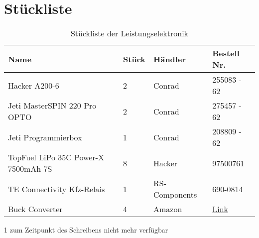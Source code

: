 \section{Stückliste}

\begin{table}[h]
    \begin{threeparttable}
    \centering
    \begin{tabular}{|l|l|l|l|}
        \hline
    Name                         & Stück & Händler & Bestell Nr. \\\hline
    Hacker A200-6                & 2      & Conrad  & 255083 - 62 \\
    Jeti MasterSPIN 220 Pro OPTO & 2      & Conrad  & 275457 - 62 \\
    Jeti Programmierbox          & 1      & Conrad  & 208809 - 62 \\
    TopFuel LiPo 35C Power-X 7500mAh 7S & 8 & Hacker & 97500761 \\
    TE Connectivity Kfz-Relais & 1 & RS-Components & 690-0814 \\
    Buck Converter & 4 & Amazon & \href{https://www.amazon.de/gp/product/B085DSMFQM/ref=ppx_yo_dt_b_asin_image_o03_s00?ie=UTF8&psc=1}{Link} \\\hline 
    \end{tabular}
    \begin{tablenotes}\footnotesize 
        \item[1] zum Zeitpunkt des Schreibens nicht mehr verfügbar 
    \end{tablenotes}
\end{threeparttable}
    \caption{Stückliste der Leistungselektronik}
\end{table}

\newpage